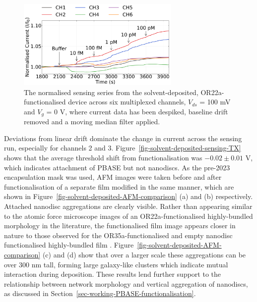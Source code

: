 \documentclass[
  a4paper,
]{scrbook}
\begin{document}
\begin{figure}

{\centering \includegraphics[width=0.7\textwidth,height=\textheight]{figures/ch7/NTQ25C5_OR22a_sample_220126_filtered_detrend_trunc_arrows_normalised.png}

}

\caption[The normalised and filtered sensing series from a
solvent-deposited, OR22a-functionalised device across six multiplexed
channels.]{\label{fig-solvent-deposited-sensing}The normalised sensing
series from the solvent-deposited, OR22a-functionalised device across
six multiplexed channels, \(V_{ds}\) = 100 mV and \(V_g\) = 0 V, where
current data has been despiked, baseline drift removed and a moving
median filter applied.}

\end{figure}

Deviations from linear drift dominate the change in current across the
sensing run, especially for channels 2 and 3.
Figure~\ref{fig-solvent-deposited-sensing-TX} shows that the average
threshold shift from functionalisation was \(-0.02 \pm 0.01\) V, which
indicates attachment of PBASE but not nanodiscs. As the pre-2023
encapsulation mask was used, AFM images were taken before and after
functionalisation of a separate film modified in the same manner, which
are shown in Figure~\ref{fig-solvent-deposited-AFM-comparison} (a) and
(b) respectively. Attached nanodisc aggregations are clearly visible.
Rather than appearing similar to the atomic force microscope images of
an OR22a-functionalised highly-bundled morphology in the literature, the
functionalised film image appears closer in nature to those observed for
the OR35a-functionalised and empty nanodisc functionalised
highly-bundled film \autocite{Murugathas2019a}.
Figure~\ref{fig-solvent-deposited-AFM-comparison} (c) and (d) show that
over a larger scale these aggregations can be over 300 nm tall, forming
large galaxy-like clusters which indicate mutual interaction during
deposition. These results lend further support to the relationship
between network morphology and vertical aggregation of nanodiscs, as
discussed in Section~\ref{sec-working-PBASE-functionalisation}.
\end{document}
